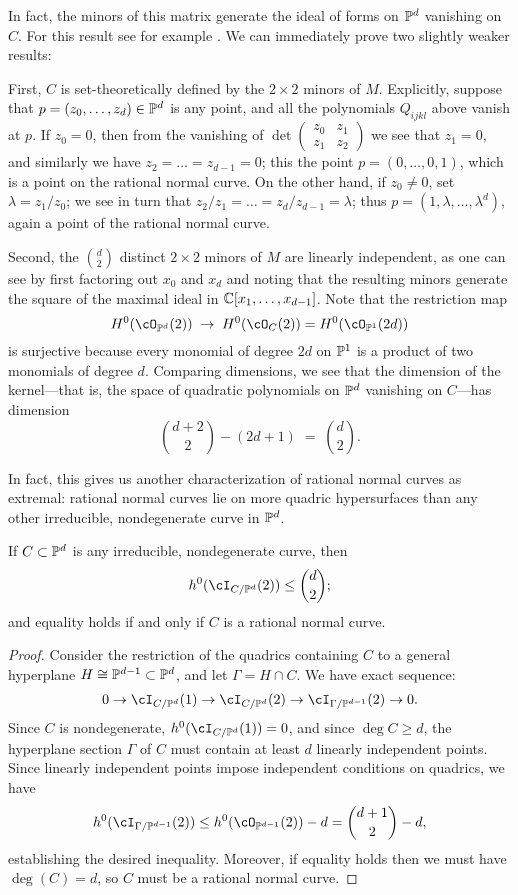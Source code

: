 In fact, the minors of this matrix generate the ideal of forms on $\PP^d$ vanishing on $C$. For this result see for example \cite[****]{E}. 
We can immediately prove two slightly weaker results:

First, $C$ is set-theoretically defined by the $2\times 2$ minors of $M$. Explicitly, suppose that $p = (z_0,\dots,z_d) \in \PP^d$ is any point, and all the polynomials $Q_{ijkl}$ above vanish at $p$. If $z_0 = 0$, then from the vanishing of 
$\det \begin{pmatrix}
z_0 & z_1  \\
z_1 & z_2 
\end{pmatrix}$ 
we see that $z_1 = 0$, and similarly we have $z_2 = \dots = z_{d-1}=0$; this the point $p = (0,\dots,0,1)$, which is a point on the rational normal curve. On the other hand, if $z_0 \neq 0$, set $\lambda = z_1/z_0$; we see in turn that $z_2/z_1 = \dots = z_d/z_{d-1} = \lambda$; thus $p = (1, \lambda, \dots,\lambda^d)$, again a point of the rational normal curve.

Second, the ${d\choose 2}$ distinct $2\times 2$ minors of $M$ are linearly independent, as one can see by first factoring out $x_0$ and $x_d$ and noting that the resulting minors generate the square of the maximal ideal in $\CC[x_1,\dots, x_{d-1}]$. Note that
the restriction map
$$
H^0(\cO_{\PP^d}(2)) \; \to \; H^0(\cO_{C}(2)) = H^0(\cO_{\PP^1}(2d))
$$
 is surjective  because every monomial of degree $2d$ on $\PP^1$ is a product of two monomials of degree $d$. Comparing dimensions, we see that the dimension of the kernel---that is, the space of quadratic polynomials on $\PP^d$ vanishing on $C$---has dimension
$$
\binom{d+2}{2} - (2d+1) \; = \; \binom{d}{2}.
$$


In fact, this gives us another characterization of rational normal curves as extremal: rational normal curves lie on more quadric hypersurfaces than any other irreducible, nondegenerate curve in $\PP^d$.

\begin{proposition}
If $C \subset \PP^d$ is any irreducible, nondegenerate curve, then
$$
h^0(\cI_{C/\PP^d}(2)) \leq  \binom{d}{2};
$$
and  equality holds if and only if $C$ is a rational normal curve.
\end{proposition}


\begin{proof}
Consider the restriction of the quadrics containing $C$ to a general hyperplane $H \cong \PP^{d-1} \subset \PP^d$, and let $\Gamma = H \cap C$. We have exact sequence:
$$
0 \to \cI_{C/\PP^d}(1) \to \cI_{C/\PP^d}(2) \to \cI_{\Gamma/\PP^{d-1}}(2) \to 0.
$$ 
Since $C$ is nondegenerate, $h^0(\cI_{C/\PP^d}(1)) = 0$, and since $\deg C \geq d$, the hyperplane section $\Gamma$ of $C$ must contain at least $d$ linearly independent points. Since linearly independent points impose independent conditions on quadrics, we have
$$
h^0(\cI_{\Gamma/\PP^{d-1}}(2)) \leq h^0(\cO_{\PP^{d-1}}(2)) - d = \binom{d+1}{2} - d,
$$
establishing the desired inequality. Moreover, if equality holds then we must have $\deg(C) = d$, so $C$ must be a rational normal curve.
\end{proof}

